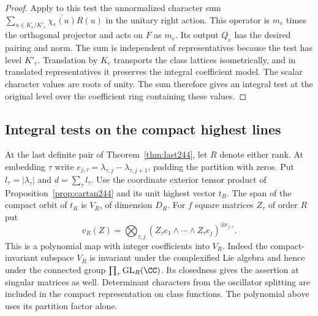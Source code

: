 \documentclass[a4paper,11pt]{article}
\theoremstyle{definition}
\theoremstyle{remark}
\numberwithin{equation}{section}
\begin{document}
\begin{proof}
Apply to this test the unnormalized character sum
\(\sum_{u\in K_e/K'_e}\overline{\chi_e(u)}R(u)\) in the
unitary right action. This operator is \(m_e\) times
the orthogonal projector and acts on \(F\) as \(m_e\).
Its output \(Q_e\) has the desired pairing and norm.
The sum is independent of representatives because the
test has level \(K'_e\). Translation by \(K_e\) transports
the class lattices isometrically, and in translated
representatives it preserves the integral coefficient
model. The scalar character values are roots of unity.
The sum therefore gives an integral test at the original
level over the coefficient ring containing these values.
\end{proof}

\subsection{Integral tests on the compact highest lines}\label{nav:V-58}
At the last definite pair of Theorem~\ref{thm:last244}, let
\(R\) denote either rank. At embedding \(\tau\) write
\(e_{j,\tau}=\lambda_{\tau,j}-\lambda_{\tau,j+1}\), padding the
partition with zeros. Put \(l_\tau=|\lambda_\tau|\) and
\(d=\sum_\tau l_\tau\). Use the coordinate exterior tensor
product of Proposition~\ref{prop:cartan244} and its unit highest
vector \(t_R\). The span of the compact orbit of \(t_R\) is
\(V_R\), of dimension \(D_R\). For \(f\) square matrices
\(Z_\tau\) of order \(R\) put
\[
 v_R(Z)=\bigotimes_{\tau,j}
    (Z_\tau e_1\wedge\cdots\wedge Z_\tau e_j)^{\otimes e_{j,\tau}} .
\]
This is a polynomial map with integer coefficients into \(V_R\).
Indeed the compact-invariant subspace \(V_R\) is invariant under
the complexified Lie algebra and hence under the connected group
\(\prod_\tau\mathrm{GL}_R(\CC)\). Its closedness gives the assertion
at singular matrices as well. Determinant characters from the
oscillator splitting are included in the compact representation
on class functions. The polynomial above uses its partition
factor alone.
\end{document}
